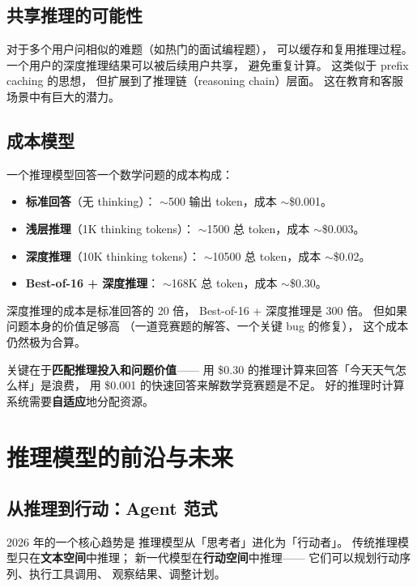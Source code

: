 \subsection{共享推理的可能性}

对于多个用户问相似的难题（如热门的面试编程题），
可以缓存和复用推理过程。
一个用户的深度推理结果可以被后续用户共享，
避免重复计算。
这类似于 prefix caching 的思想，
但扩展到了推理链（reasoning chain）层面。
这在教育和客服场景中有巨大的潜力。

\subsection{成本模型}

一个推理模型回答一个数学问题的成本构成：
\begin{itemize}[noitemsep]
  \item \textbf{标准回答}（无 thinking）：
        $\sim$500 输出 token，成本 $\sim$\$0.001。
  \item \textbf{浅层推理}（1K thinking tokens）：
        $\sim$1500 总 token，成本 $\sim$\$0.003。
  \item \textbf{深度推理}（10K thinking tokens）：
        $\sim$10500 总 token，成本 $\sim$\$0.02。
  \item \textbf{Best-of-16 + 深度推理}：
        $\sim$168K 总 token，成本 $\sim$\$0.30。
\end{itemize}

深度推理的成本是标准回答的 20 倍，
Best-of-16 + 深度推理是 300 倍。
但如果问题本身的价值足够高
（一道竞赛题的解答、一个关键 bug 的修复），
这个成本仍然极为合算。

关键在于\textbf{匹配推理投入和问题价值}——
用 \$0.30 的推理计算来回答「今天天气怎么样」是浪费，
用 \$0.001 的快速回答来解数学竞赛题是不足。
好的推理时计算系统需要\textbf{自适应}地分配资源。


\section{推理模型的前沿与未来}

\subsection{从推理到行动：Agent 范式}

2026 年的一个核心趋势是
推理模型从「思考者」进化为「行动者」。
传统推理模型只在\textbf{文本空间}中推理；
新一代模型在\textbf{行动空间}中推理——
它们可以规划行动序列、执行工具调用、
观察结果、调整计划。

